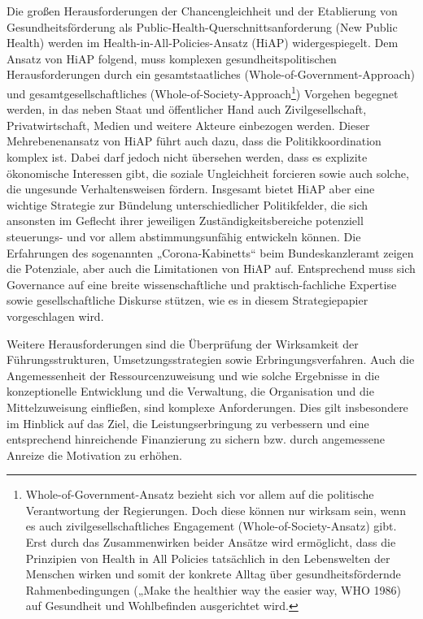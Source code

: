 \documentclass{article}
\begin{document}
Die großen Herausforderungen der Chancengleichheit und der Etablierung von Gesundheitsförderung als Public-Health-Querschnittsanforderung (New Public Health) werden im Health-in-All-Policies-Ansatz (HiAP) widergespiegelt. Dem Ansatz von HiAP folgend, muss komplexen gesundheitspolitischen Herausforderungen durch ein gesamtstaatliches (Whole-of-Government-Approach) und gesamtgesellschaftliches (Whole-of-Society-Approach\footnote{Whole-of-Government-Ansatz bezieht sich vor allem auf die politische Verantwortung der Regierungen. Doch diese können nur wirksam sein, wenn es auch zivilgesellschaftliches Engagement (Whole-of-Society-Ansatz) gibt. Erst durch das Zusammenwirken beider Ansätze wird ermöglicht, dass die Prinzipien von Health in All Policies tatsächlich in den Lebenswelten der Menschen wirken und somit der konkrete Alltag über gesundheitsfördernde Rahmenbedingungen („Make the healthier way the easier way, WHO 1986) auf Gesundheit und Wohlbefinden ausgerichtet wird.}) Vorgehen begegnet werden, in das neben Staat und öffentlicher Hand auch Zivilgesellschaft, Privatwirtschaft, Medien und weitere Akteure einbezogen werden. Dieser Mehrebenenansatz von HiAP führt auch dazu, dass die Politikkoordination komplex ist. Dabei darf jedoch nicht übersehen werden, dass es explizite ökonomische Interessen gibt, die soziale Ungleichheit forcieren sowie auch solche, die ungesunde Verhaltensweisen fördern. Insgesamt bietet HiAP aber eine wichtige Strategie zur Bündelung unterschiedlicher Politikfelder, die sich ansonsten im Geflecht ihrer jeweiligen Zuständigkeitsbereiche potenziell steuerungs- und vor allem abstimmungsunfähig entwickeln können. Die Erfahrungen des sogenannten „Corona-Kabinetts“ beim Bundeskanzleramt zeigen die Potenziale, aber auch die Limitationen von HiAP auf. Entsprechend muss sich Governance auf eine breite wissenschaftliche und praktisch-fachliche Expertise sowie gesellschaftliche Diskurse stützen, wie es in diesem Strategiepapier vorgeschlagen wird.


Weitere Herausforderungen sind die Überprüfung der Wirksamkeit der Führungsstrukturen, Umsetzungsstrategien sowie Erbringungsverfahren. Auch die Angemessenheit der Ressourcenzuweisung und wie solche Ergebnisse in die konzeptionelle Entwicklung und die Verwaltung, die Organisation und die Mittelzuweisung einfließen, sind komplexe Anforderungen. Dies gilt insbesondere im Hinblick auf das Ziel, die Leistungserbringung zu verbessern und eine entsprechend hinreichende Finanzierung zu sichern bzw. durch angemessene Anreize die Motivation zu erhöhen.
\end{document}
